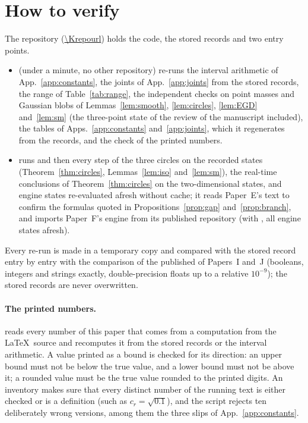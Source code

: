 \section{How to verify}
\label{app:verify}
\begingroup\raggedright   %

The repository (\url{\Krepourl}) holds the code, the stored records and two entry points.
\begin{itemize}
\item {} (under a minute, no other repository) re-runs the interval arithmetic of App.~\ref{app:constants}, the joints of App.~\ref{app:joints} from the stored records, the range of Table~\ref{tab:range}, the independent checks on point masses and Gaussian blobs of Lemmas~\ref{lem:smooth}, \ref{lem:circles}, \ref{lem:EGD} and~\ref{lem:sm} (the three-point state of the review of the manuscript included), the tables of Apps.~\ref{app:constants} and~\ref{app:joints}, which it regenerates from the records, and the check of the printed numbers.
\item {}   runs  and then every step of the three circles on the recorded states (Theorem~\ref{thm:circles}, Lemmas~\ref{lem:iso} and~\ref{lem:sm}), the real-time conclusions of Theorem~\ref{thm:circles} on the two-dimensional states, and engine states re-evaluated afresh without cache; it reads Paper~E's text to confirm the formulas quoted in Propositions~\ref{prop:gap} and~\ref{prop:branch}, and imports Paper~F's engine from its published repository (with , all engine states afresh).
\end{itemize}
Every re-run is made in a temporary copy and compared with the stored record entry by entry with the comparison of the published  of Papers~I and~J (booleans, integers and strings exactly, double-precision floats up to a relative $10^{-9}$); the stored records are never overwritten.

\paragraph*{The printed numbers.}
 reads every number of this paper that comes from a computation from the \LaTeX\ source and recomputes it from the stored records or the interval arithmetic.
A value printed as a bound is checked for its direction: an upper bound must not be below the true value, and a lower bound must not be above it; a rounded value must be the true value rounded to the printed digits.
An inventory makes sure that every distinct number of the running text is either checked or is a definition (such as $c_r=\sqrt{0.1}$), and the script rejects ten deliberately wrong versions, among them the three slips of App.~\ref{app:constants}.
\par\endgroup
